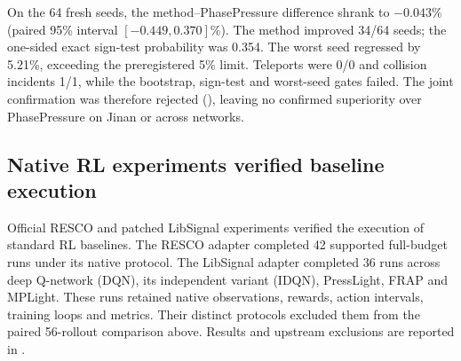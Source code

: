 On the 64 fresh seeds, the method--PhasePressure difference shrank to
$-0.043\%$ (paired 95\% interval $[-0.449,0.370]\%$).  The method improved
34/64 seeds; the one-sided exact sign-test probability was 0.354.  The worst
seed regressed by 5.21\%, exceeding the preregistered 5\% limit.  Teleports were
0/0 and collision incidents 1/1, while the bootstrap, sign-test and worst-seed
gates failed.  The joint confirmation was therefore rejected
(), leaving no confirmed
superiority over PhasePressure on Jinan or across networks.

\subsection{Native RL experiments verified baseline execution}

Official RESCO and patched LibSignal experiments verified the execution of
standard RL baselines.  The RESCO adapter completed 42 supported full-budget
runs under its native protocol.  The LibSignal adapter completed 36 runs across
deep Q-network (DQN), its independent variant (IDQN), PressLight, FRAP and
MPLight.  These runs retained native observations, rewards, action intervals,
training loops and metrics.  Their distinct protocols excluded them from the
paired 56-rollout comparison above.  Results and upstream exclusions are
reported in .

\FloatBarrier
